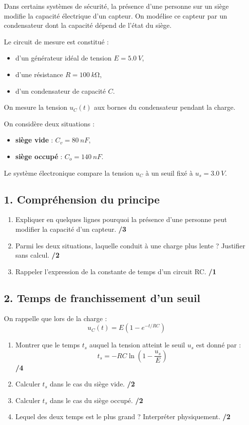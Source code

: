 \documentclass[11pt,a4paper]{article}
\begin{document}
Dans certains systèmes de sécurité, la présence d'une personne sur un siège modifie la capacité électrique d'un capteur. On modélise ce capteur par un condensateur dont la capacité dépend de l'état du siège.

Le circuit de mesure est constitué :
\begin{itemize}
    \item d'un générateur idéal de tension \(E=\SI{5.0}{V}\),
    \item d'une résistance \(R=\SI{100}{k\ohm}\),
    \item d'un condensateur de capacité \(C\).
\end{itemize}

On mesure la tension \(u_C(t)\) aux bornes du condensateur pendant la charge.

On considère deux situations :
\begin{itemize}
    \item \textbf{siège vide} : \(C_v = \SI{80}{nF}\),
    \item \textbf{siège occupé} : \(C_o = \SI{140}{nF}\).
\end{itemize}

Le système électronique compare la tension \(u_C\) à un seuil fixé à \(u_s = \SI{3.0}{V}\).

\subsection*{1. Compréhension du principe}
\begin{enumerate}
    \item Expliquer en quelques lignes pourquoi la présence d'une personne peut modifier la capacité d'un capteur. \hfill \textbf{/3}
    \item Parmi les deux situations, laquelle conduit à une charge plus lente ? Justifier sans calcul. \hfill \textbf{/2}
    \item Rappeler l'expression de la constante de temps d'un circuit RC. \hfill \textbf{/1}
\end{enumerate}

\subsection*{2. Temps de franchissement d'un seuil}
On rappelle que lors de la charge :
\[
u_C(t)=E\left(1-e^{-t/RC}\right)
\]

\begin{enumerate}
    \item Montrer que le temps \(t_s\) auquel la tension atteint le seuil \(u_s\) est donné par :
    \[
    t_s=-RC\ln\left(1-\frac{u_s}{E}\right)
    \]
    \hfill \textbf{/4}
    \item Calculer \(t_s\) dans le cas du siège vide. \hfill \textbf{/2}
    \item Calculer \(t_s\) dans le cas du siège occupé. \hfill \textbf{/2}
    \item Lequel des deux temps est le plus grand ? Interpréter physiquement. \hfill \textbf{/2}
\end{enumerate}
\end{document}
